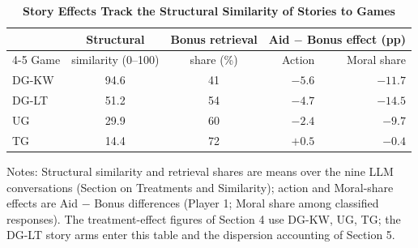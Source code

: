 \begin{table}[!htbp]
\centering
\small
\renewcommand{\arraystretch}{1.15}
\caption{\textbf{Story Effects Track the Structural Similarity of Stories to Games}}
\label{tab:similarity_gradient}
\begin{tabular}{l cc rr}
\toprule
 & Structural & Bonus retrieval & \multicolumn{2}{c}{Aid $-$ Bonus effect (pp)} \\
\cmidrule(lr){4-5}
Game & similarity (0--100) & share (\%) & Action & Moral share \\
\midrule
DG-KW & 94.6 & 41 & $-5.6$ & $-11.7$ \\
DG-LT & 51.2 & 54 & $-4.7$ & $-14.5$ \\
UG & 29.9 & 60 & $-2.4$ & $-9.7$ \\
TG & 14.4 & 72 & $+0.5$ & $-0.4$ \\
\bottomrule
\end{tabular}
\begin{flushleft}
\footnotesize Notes: Structural similarity and retrieval shares are means over the nine LLM conversations (Section on Treatments and Similarity); action and Moral-share effects are Aid $-$ Bonus differences (Player 1; Moral share among classified responses). The treatment-effect figures of Section 4 use DG-KW, UG, TG\@; the DG-LT story arms enter this table and the dispersion accounting of Section 5.
\end{flushleft}
\end{table}
